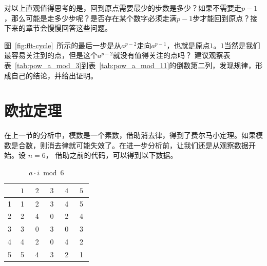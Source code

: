 \begin{thinking}
\label{thk:flt_steps}
对以上直观值得思考的是，回到原点需要最少的步数是多少？如果不需要走$p - 1$，那么可能是走多少步呢？是否存在某个数字必须走满$p - 1$步才能回到原点？接下来的章节会慢慢回答这些问题。
\end{thinking}

\begin{thinking}
\label{thk:flt_laststep}
图~\ref{fig:flt-cycle}~所示的最后一步是从$a^{p-2}$走向$a^{p-1}$，也就是原点$1$。$1$当然是我们最容易关注到的点，但是这个$a^{p-2}$就没有值得关注的点吗？
建议观察表表~\ref{tab:pow_a_mod_3}到表~\ref{tab:pow_a_mod_11}的倒数第二列，发现规律，形成自己的结论，并给出证明。
\end{thinking}

\section{欧拉定理}
\label{sec:euler_thm}
在上一节的分析中，模数是一个素数，借助消去律，得到了费尔马小定理。如果模数是合数，则消去律就可能失效了。在进一步分析前，让我们还是从观察数据开始。设 $n = 6$，
借助之前的代码，可以得到以下数据。
\begin{table}[htbp]
	\centering
		\begin{tabular}{ | c | c | c | c | c | c | }
			\hline
			\diagbox{$a$}{$a \cdot i \;$}{$i \;$}  & $\; 1 \;$ & $\; 2 \;$ & $\; 3 \;$ & $\; 4 \;$ & $\; 5 \;$ \\ \hline
			1 & 1 & 2 & 3 & 4 & 5 \\ \hline
			2 & 2 & 4 & 0 & 2 & 4 \\ \hline
			3 & 3 & 0 & 3 & 0 & 3 \\ \hline
			4 & 4 & 2 & 0 & 4 & 2 \\ \hline
			5 & 5 & 4 & 3 & 2 & 1 \\
			\hline
		\end{tabular}
	\centering\caption{$a \cdot i \bmod 6$}
\label{tab:ai_mod_6}
\end{table}

